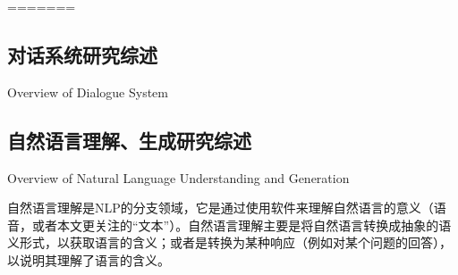 =======
\subsection{对话系统研究综述}{Overview of Dialogue System}


\subsection{自然语言理解、生成研究综述}{Overview of Natural Language Understanding and Generation}

自然语言理解是NLP的分支领域，它是通过使用软件来理解自然语言的意义（语音，或者本文更关注的“文本”）。自然语言理解主要是将自然语言转换成抽象的语义形式，以获取语言的含义；或者是转换为某种响应（例如对某个问题的回答），以说明其理解了语言的含义。

